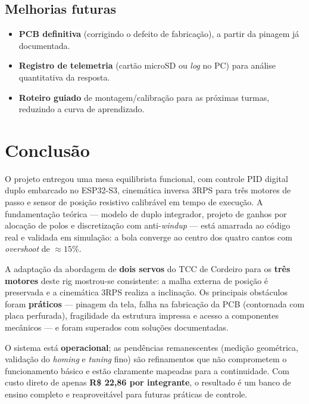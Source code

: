 \documentclass[11pt,a4paper,oneside]{article}
\begin{document}
\subsection{Melhorias futuras}

\begin{itemize}
  \item \textbf{PCB definitiva} (corrigindo o defeito de fabricação), a partir da
  pinagem já documentada.
  \item \textbf{Registro de telemetria} (cartão microSD ou \emph{log} no PC) para
  análise quantitativa da resposta.
  \item \textbf{Roteiro guiado} de montagem/calibração para as próximas turmas,
  reduzindo a curva de aprendizado.
\end{itemize}

\section{Conclusão}

O projeto entregou uma mesa equilibrista funcional, com controle PID digital
duplo embarcado no ESP32-S3, cinemática inversa 3RPS para três motores de passo e
sensor de posição resistivo calibrável em tempo de execução. A fundamentação
teórica — modelo de duplo integrador, projeto de ganhos por alocação de polos e
discretização com anti-\emph{windup} — está amarrada ao código real e validada em
simulação: a bola converge ao centro dos quatro cantos com \emph{overshoot} de
$\approx 15\%$.

A adaptação da abordagem de \textbf{dois servos} do TCC de Cordeiro para os
\textbf{três motores} deste rig mostrou-se consistente: a malha externa de
posição é preservada e a cinemática 3RPS realiza a inclinação. Os principais
obstáculos foram \textbf{práticos} — pinagem da tela, falha na fabricação da PCB
(contornada com placa perfurada), fragilidade da estrutura impressa e acesso a
componentes mecânicos — e foram superados com soluções documentadas.

O sistema está \textbf{operacional}; as pendências remanescentes (medição
geométrica, validação do \emph{homing} e \emph{tuning} fino) são refinamentos que
não comprometem o funcionamento básico e estão claramente mapeadas para a
continuidade. Com custo direto de apenas \textbf{R\$ 22,86 por integrante}, o
resultado é um banco de ensino completo e reaproveitável para futuras práticas de
controle.
\end{document}
